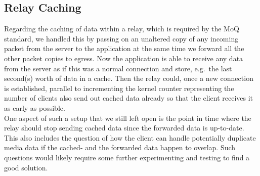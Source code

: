 \subsection{Relay Caching}
Regarding the caching of data within a relay, which is required by the MoQ standard, we handled this 
by passing on an unaltered copy of any incoming packet from the server to the application at the same 
time we forward all the other packet copies to egress.
Now the application is able to receive any data from the server as if this was a normal connection and 
store, e.g.~the last second(s) worth of data in a cache.
Then the relay could, once a new connection is established, parallel to incrementing the kernel counter 
representing the number of clients also send out cached data already so that the client receives it
as early as possible.
\\
One aspect of such a setup that we still left open is the point in time where the relay should stop 
sending cached data since the forwarded data is up-to-date.
This also includes the question of how the client can handle potentially duplicate media data if the 
cached- and the forwarded data happen to overlap.
Such questions would likely require some further experimenting and testing to find a good solution.
